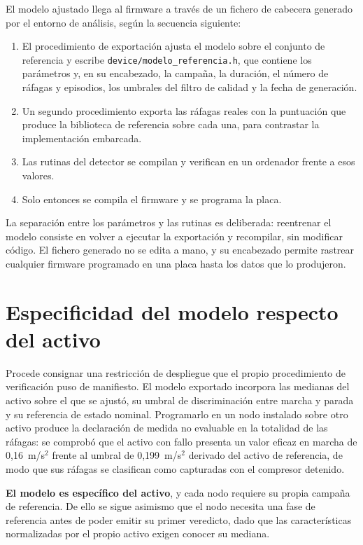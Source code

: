 El modelo ajustado llega al firmware a través de un fichero de cabecera generado por el entorno
de análisis, según la secuencia siguiente:

\begin{enumerate}
\item El procedimiento de exportación ajusta el modelo sobre el conjunto de referencia y escribe
      \texttt{device/modelo\_referencia.h}, que contiene los parámetros y, en su encabezado, la
      campaña, la duración, el número de ráfagas y episodios, los umbrales del filtro de calidad
      y la fecha de generación.
\item Un segundo procedimiento exporta las ráfagas reales con la puntuación que produce la
      biblioteca de referencia sobre cada una, para contrastar la implementación embarcada.
\item Las rutinas del detector se compilan y verifican en un ordenador frente a esos valores.
\item Solo entonces se compila el firmware y se programa la placa.
\end{enumerate}

La separación entre los parámetros y las rutinas es deliberada: reentrenar el modelo consiste en
volver a ejecutar la exportación y recompilar, sin modificar código. El fichero generado no se
edita a mano, y su encabezado permite rastrear cualquier firmware programado en una placa hasta
los datos que lo produjeron.

\section{Especificidad del modelo respecto del activo}

Procede consignar una restricción de despliegue que el propio procedimiento de verificación puso
de manifiesto. El modelo exportado incorpora las medianas del activo sobre el que se ajustó, su
umbral de discriminación entre marcha y parada y su referencia de estado nominal. Programarlo en
un nodo instalado sobre otro activo produce la declaración de medida no evaluable en la
totalidad de las ráfagas: se comprobó que el activo con fallo presenta un valor eficaz en marcha
de \mbox{0,16 m/s$^2$} frente al umbral de \mbox{0,199 m/s$^2$} derivado del activo de
referencia, de modo que sus ráfagas se clasifican como capturadas con el compresor detenido.

\textbf{El modelo es específico del activo}, y cada nodo requiere su propia campaña de
referencia. De ello se sigue asimismo que el nodo necesita una fase de referencia antes de poder
emitir su primer veredicto, dado que las características normalizadas por el propio activo
exigen conocer su mediana.

